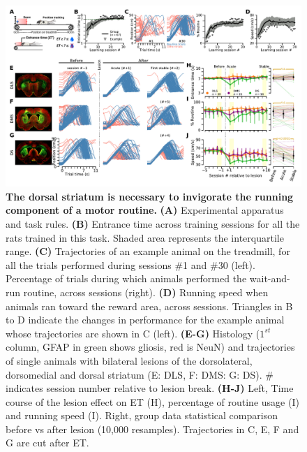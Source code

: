 \begin{figure}[bth!]
	\begin{center}
	   \includegraphics[width=\textwidth]{ch-lesion/figures/Task_Example_Group.pdf}
	   \caption
	   {\textbf{The dorsal striatum is necessary to invigorate the running component of a motor routine.}
	   \textbf{(A)} Experimental apparatus and task rules.
	   \textbf{(B)} Entrance time across training sessions for all the rats trained in this task.  
   Shaded area represents the interquartile range.
   \textbf{(C)} Trajectories of an example animal on the treadmill, for all the trials performed during sessions \#1 and \#30 (left).
   Percentage of trials during which animals performed the wait-and-run routine, across sessions (right).
   \textbf{(D)} Running speed when animals ran toward the reward area, across sessions.
   Triangles in B to D indicate the changes in performance for the example animal whose trajectories are shown in C (left).
	   \textbf{(E-G)} Histology ($1^{st}$ column, GFAP in green shows gliosis, red is NeuN) and trajectories of single animals with bilateral lesions of the dorsolateral, dorsomedial and dorsal striatum (E: DLS, F: DMS: G: DS).
	   \# indicates session number relative to lesion break.
	   \textbf{(H-J)} Left, Time course of the lesion effect on ET (H), percentage of routine usage (I) and running speed (I).
	   Right, group data statistical comparison before vs after lesion (10,000 resamples).
	   Trajectories in C, E, F and G are cut after ET.
	   }
	   \label{fig:lesion:task}
	\end{center}
   \end{figure}